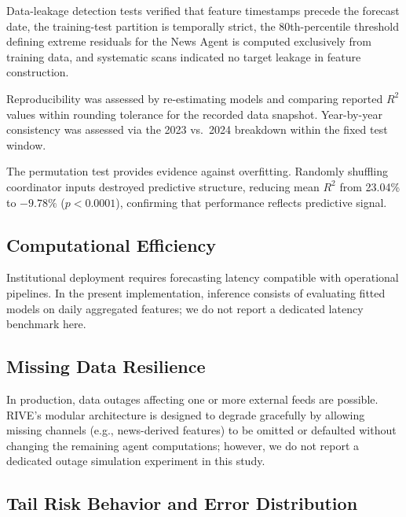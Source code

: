\documentclass[review]{elsarticle}
\begin{document}
Data-leakage detection tests verified that feature timestamps precede the forecast date, the training-test partition is temporally strict, the 80th-percentile threshold defining extreme residuals for the News Agent is computed exclusively from training data, and systematic scans indicated no target leakage in feature construction.

Reproducibility was assessed by re-estimating models and comparing reported $R^2$ values within rounding tolerance for the recorded data snapshot. Year-by-year consistency was assessed via the 2023 vs.\ 2024 breakdown within the fixed test window.

The permutation test provides evidence against overfitting. Randomly shuffling coordinator inputs destroyed predictive structure, reducing mean $R^2$ from 23.04\% to $-9.78\%$ ($p < 0.0001$), confirming that performance reflects predictive signal. %

\subsection{Computational Efficiency}\label{sec:latency}

Institutional deployment requires forecasting latency compatible with operational pipelines. In the present implementation, inference consists of evaluating fitted models on daily aggregated features; we do not report a dedicated latency benchmark here. %

\subsection{Missing Data Resilience}\label{sec:missing-data}

In production, data outages affecting one or more external feeds are possible. RIVE's modular architecture is designed to degrade gracefully by allowing missing channels (e.g., news-derived features) to be omitted or defaulted without changing the remaining agent computations; however, we do not report a dedicated outage simulation experiment in this study. %

\subsection{Tail Risk Behavior and Error Distribution}\label{sec:tail-risk}
\end{document}
